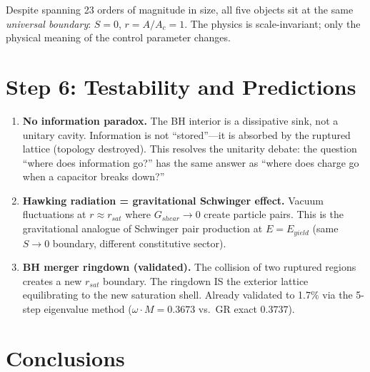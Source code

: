 \noindent
Despite spanning 23 orders of magnitude in size, all five objects sit
at the same \textit{universal boundary}: $S = 0$, $r = A/A_c = 1$.
The physics is scale-invariant; only the physical meaning of the
control parameter changes.

\section{Step 6: Testability and Predictions}

\begin{enumerate}
    \item \textbf{No information paradox.}
    The BH interior is a dissipative sink, not a unitary cavity.
    Information is not ``stored''---it is absorbed by the ruptured lattice
    (topology destroyed). This resolves the unitarity debate:
    the question ``where does information go?'' has the same answer
    as ``where does charge go when a capacitor breaks down?''

    \item \textbf{Hawking radiation = gravitational Schwinger effect.}
    Vacuum fluctuations at $r \approx r_{sat}$ where $G_{shear} \to 0$
    create particle pairs. This is the gravitational analogue of
    Schwinger pair production at $E = E_{yield}$ (same $S \to 0$ boundary,
    different constitutive sector).

    \item \textbf{BH merger ringdown (validated).}
    The collision of two ruptured regions creates a new $r_{sat}$ boundary.
    The ringdown IS the exterior lattice equilibrating to the new
    saturation shell. Already validated to 1.7\% via the 5-step
    eigenvalue method ($\omega \cdot M = 0.3673$ vs.\ GR exact $0.3737$).
\end{enumerate}

\section{Conclusions}

